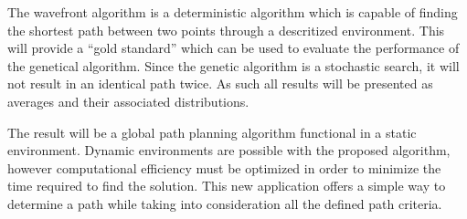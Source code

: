 The wavefront algorithm is a deterministic algorithm which is capable of finding the shortest path between two points through a descritized environment. This will provide a ``gold standard'' which can be used to evaluate the performance of the genetical algorithm. Since the genetic algorithm is a stochastic search, it will not result in an identical path twice. As such all results will be presented as averages and their associated distributions.

The result will be a global path planning algorithm functional in a static environment. Dynamic environments are possible with the proposed algorithm, however computational efficiency must be optimized in order to minimize the time required to find the solution. This new application offers a simple way to determine a path while taking into consideration all the defined path criteria.
